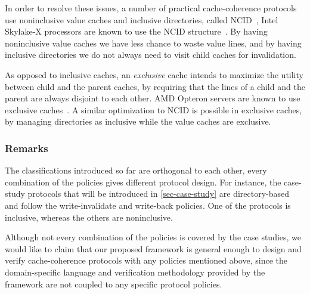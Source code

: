 In order to resolve these issues, a number of practical cache-coherence protocols use noninclusive value caches and inclusive directories, called NCID~\cite{Zhao:2010}, \eg{} Intel Skylake-X processors are known to use the NCID structure~\cite{intel-non-inclusive,Yan:2019}.
By having noninclusive value caches we have less chance to waste value lines, and by having inclusive directories we do not always need to visit child caches for invalidation.

As opposed to inclusive caches, an \emph{exclusive} cache intends to maximize the utility between child and the parent caches, by requiring that the lines of a child and the parent are always disjoint to each other.
AMD Opteron servers are known to use exclusive caches~\cite{Irazoqui:2016}.
A similar optimization to NCID is possible in exclusive caches, by managing directories as inclusive while the value caches are exclusive.

\subsubsection{Remarks}

The classifications introduced so far are orthogonal to each other, \ie{} every combination of the policies gives different protocol design.
For instance, the case-study protocols that will be introduced in \autoref{sec-case-study} are directory-based and follow the write-invalidate and write-back policies.
One of the protocols is inclusive, whereas the others are noninclusive.

Although not every combination of the policies is covered by the case studies, we would like to claim that our proposed framework \hemiola{} is general enough to design and verify cache-coherence protocols with any policies mentioned above, since the domain-specific language and verification methodology provided by the framework are not coupled to any specific protocol policies.

